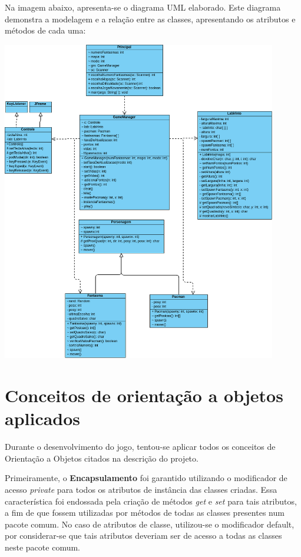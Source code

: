 \documentclass[]{article}
\begin{document}
Na imagem abaixo, apresenta-se o diagrama UML elaborado. Este diagrama demonstra a modelagem e a relação entre as classes, apresentando os atributos e métodos de cada uma:

\begin{center}
\includegraphics[width=12cm]{UML.png}
\end{center}

\section{Conceitos de orientação a objetos aplicados}
Durante o desenvolvimento do jogo, tentou-se aplicar todos os conceitos de Orientação a Objetos citados na descrição do projeto.

Primeiramente, o \textbf{Encapsulamento} foi garantido utilizando o modificador de acesso \textsl{private} para todos os atributos de instância das classes criadas. Essa característica foi endossada pela criação de métodos \textsl{get} e \textsl{set} para tais atributos, a fim de que fossem utilizadas por métodos de todas as classes presentes num pacote comum. No caso de atributos de classe, utilizou-se o modificador default, por considerar-se que tais atributos deveriam ser de acesso a todas as classes neste pacote comum.
\end{document}
